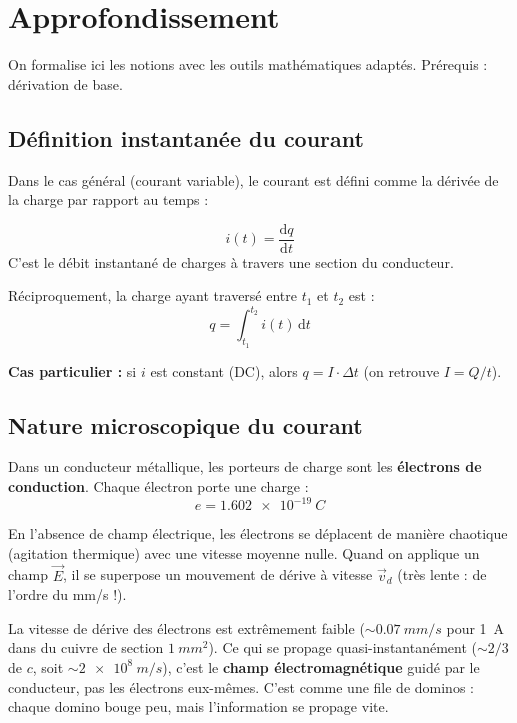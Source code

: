 \documentclass[12pt,a4paper,twoside]{book}
\begin{document}
\section{Approfondissement}

\begin{approfondissement}
On formalise ici les notions avec les outils mathématiques adaptés. Prérequis : dérivation de base.
\end{approfondissement}

\subsection{Définition instantanée du courant}

Dans le cas général (courant variable), le courant est défini comme la dérivée de la charge par rapport au temps :

\begin{formule}
\[
\boxed{i(t) = \frac{\mathrm{d}q}{\mathrm{d}t}}
\]
C'est le débit instantané de charges à travers une section du conducteur.

Réciproquement, la charge ayant traversé entre $t_1$ et $t_2$ est :
\[
q = \int_{t_1}^{t_2} i(t)\,\mathrm{d}t
\]
\end{formule}

\textbf{Cas particulier :} si $i$ est constant (DC), alors $q = I \cdot \Delta t$ (on retrouve $I = Q/t$).

\subsection{Nature microscopique du courant}

Dans un conducteur métallique, les porteurs de charge sont les \textbf{électrons de conduction}. Chaque électron porte une charge :
\[
e = \SI{1.602e-19}{C}
\]

En l'absence de champ électrique, les électrons se déplacent de manière chaotique (agitation thermique) avec une vitesse moyenne nulle. Quand on applique un champ $\vec{E}$, il se superpose un mouvement de dérive à vitesse $\vec{v}_d$ (très lente : de l'ordre du mm/s !).

\begin{attention}
La vitesse de dérive des électrons est extrêmement faible ($\sim \SI{0.07}{mm/s}$ pour \SI{1}{A} dans du cuivre de section $\SI{1}{mm^2}$). Ce qui se propage quasi-instantanément ($\sim 2/3$ de $c$, soit $\sim \SI{2e8}{m/s}$), c'est le \textbf{champ électromagnétique} guidé par le conducteur, pas les électrons eux-mêmes. C'est comme une file de dominos : chaque domino bouge peu, mais l'information se propage vite.
\end{attention}
\end{document}

